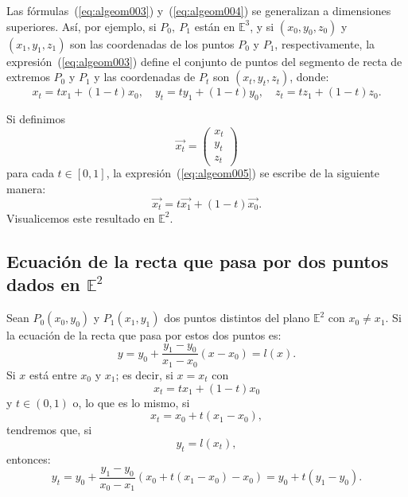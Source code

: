 Las fórmulas~(\ref{eq:algeom003}) y~(\ref{eq:algeom004}) se generalizan a dimensiones superiores.
Así, por ejemplo, si $P_{0},\ P_{1}$ están en $\mathbb{E}^{3}$, y si $(x_{0},y_{0},z_{0})$ y
$(x_{1},y_{1},z_{1})$ son las coordenadas de los puntos $P_{0}$ y $P_{1}$, respectivamente, la
expresión~(\ref{eq:algeom003}) define el conjunto de puntos del segmento de recta de extremos
$P_{0}$ y $P_{1}$ y las coordenadas de $P_{t}$ son $(x_{t},y_{t},z_{t})$, donde:
\begin{equation}
\label{eq:algeom005}
x_{t}=tx_{1}+(1-t)x_{0}, \quad
y_{t}=ty_{1}+(1-t)y_{0}, \quad
z_{t}=tz_{1}+(1-t)z_{0}.
\end{equation}

Si definimos
\[
\overrightarrow{x_{t}} = \left(\begin{array}{c}
x_{t} \\
y_{t} \\
z_{t}
\end{array}\right)
\]
para cada $t\in [0,1]$, la expresión~(\ref{eq:algeom005}) se escribe de la siguiente manera:
\begin{equation}
\label{eq:algeom006}
\overrightarrow{x_{t}} = t\overrightarrow{x_{1}}+(1-t)\overrightarrow{x_{0}}.
\end{equation}
Visualicemos este resultado en $\mathbb{E}^{2}$.

\subsection{Ecuación de la recta que pasa por dos puntos dados en $\mathbb{E}^{2}$}

Sean $P_{0}(x_{0}, y_{0})$ y $P_{1}(x_{1},y_{1})$ dos puntos distintos del plano $\mathbb{E}^{2}$
con $x_{0}\neq x_{1}$. Si la ecuación de la recta que pasa por estos dos puntos es:
\begin{equation}
\label{eq:algeom007}
y = y_{0}+ \frac{y_{1}-y_{0}}{x_{1}-x_{0}} (x-x_{0})= l(x).
\end{equation}
Si $x$ está entre $x_{0}$ y $x_{1}$; es decir, si $x = x_t$ con
\[
x_{t}=tx_{1}+(1-t)x_{0}
\]
y $t\in (0,1)$ o, lo que es lo mismo, si
\begin{equation}
\label{eq:algeom008}
x_{t} = x_{0} + t(x_{1}-x_{0}),
\end{equation}
tendremos que, si
\begin{equation}
\label{eq:algeom009}
y_{t}=l(x_{t}),
\end{equation}
entonces:
\begin{equation}
\label{eq:algeom010}
y_{t} = y_{0}+ \frac{y_{1}-y_{0}}{x_{0}-x_{1}} (x_{0}+t(x_{1}-x_{0})-x_{0})=y_{0}+t(y_{1}-y_{0}).
\end{equation}

